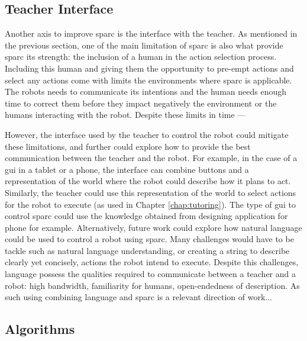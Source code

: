 \subsection{Teacher Interface}

Another axis to improve \gls{sparc} is the interface with the teacher. As mentioned in the previous section, one of the main limitation of \gls{sparc} is also what provide \gls{sparc} its strength: the inclusion of a human in the action selection process. Including this human and giving them the opportunity to pre-empt actions and select any actions come with limits the environments where \gls{sparc} is applicable. The robots needs to communicate its intentions and the human needs enough time to correct them before they impact negatively the environment or the humans interacting with the robot. Despite these limits in time ---

However, the interface used by the teacher to control the robot could mitigate these limitations, and further could explore how to provide the best communication between the teacher and the robot. For example, in the case of a \gls{gui} in a tablet or a phone, the interface can combine buttons and a representation of the world where the robot could describe how it plans to act. Similarly, the teacher could use this representation of the world to select actions for the robot to execute (as used in Chapter \ref{chap:tutoring}). The type of \gls{gui} to control \gls{sparc} could use the knowledge obtained from designing application for phone for example. Alternatively, future work could explore how natural language could be used to control a robot using \gls{sparc}. Many challenges would have to be tackle such as natural language understanding, or creating a string to describe clearly yet concisely, actions the robot intend to execute. Despite this challenges, language possess the qualities required to communicate between a teacher and a robot: high bandwidth, familiarity for humans, open-endedness of description. As such using combining language and \gls{sparc} is a relevant direction of work...

\subsection{Algorithms}

